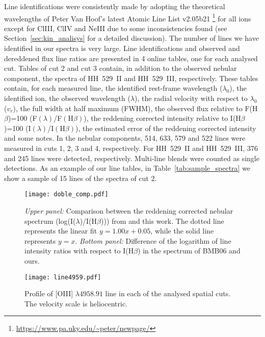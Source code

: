 \documentclass[fleqn,usenatbib]{mnras}
\begin{document}
Line identifications were consistently made by adopting the theoretical wavelengths of Peter Van Hoof's latest Atomic Line List v2.05b21 \footnote{\url{https://www.pa.uky.edu/~peter/newpage/}} \citep{vanhoof18} for all ions except for \mbox{Cl}\thinspace \mbox{III}, \mbox{Cl}\thinspace \mbox{IV} and \mbox{Ne}\thinspace \mbox{III} due to some inconsistencies found (see Section~\ref{sec:kin_analisys} for a detailed discussion). The number of lines we have identified in our spectra is very large. Line identifications and observed and dereddened flux line ratios  are presented in 4 online tables, one for each analysed cut. Tables of cut 2 and cut 3 contain, in addition to the observed nebular component, the spectra of HH~529~II and HH~529~III, respectively. These tables contain, for each measured line, the identified rest-frame wavelength ($\lambda_0$), the identified ion, the observed wavelength ($\lambda$), the radial velocity with respect to $\lambda_0$ ($v_r$), the full width at half maximum (FWHM), the observed flux relative to F(H$\beta$)=100 (F$\left( \lambda \right)$/F$\left( \mbox{H}\beta \right)$), the reddening corrected intensity relative to I(H$\beta$)=100 (I$\left( \lambda \right)$/I$\left( \mbox{H}\beta \right)$), the estimated error of the reddening corrected intensity and some notes. In the nebular components, 514, 633, 579 and 522 lines were measured in cuts 1, 2, 3 and 4, respectively. For HH~529~II and HH~529~III, 376 and 245 lines were detected, respectively. Multi-line blends were counted as single detections. As an example of our line tables, in Table~\ref{tab:sample_spectra} we show a sample of 15 lines of the spectra of cut 2.
\begin{figure}
\texttt{[image: doble\_comp.pdf]}
\caption{\textit{Upper panel:} Comparison between the reddening corrected nebular spectrum (log(I($\lambda$)/I(H$\beta$))) from \citet{Blagrave06} and this work. The dotted line represents the linear fit $y = 1.00x + 0.05$, while the solid line represents $y = x$. \textit{Bottom panel:} Difference of the logarithm of line intensity ratios with respect to I(H$\beta$) in the spectrum of BMB06 and ours. }
\label{fig:compari}
\end{figure}

\begin{figure}
\texttt{[image: line4959.pdf]}
\caption{Profile of [O\thinspace III] $\lambda 4958.91$ line in each of the analysed spatial cuts.
The velocity scale is heliocentric.}
\label{fig:4959_vel}
\end{figure}
\end{document}
